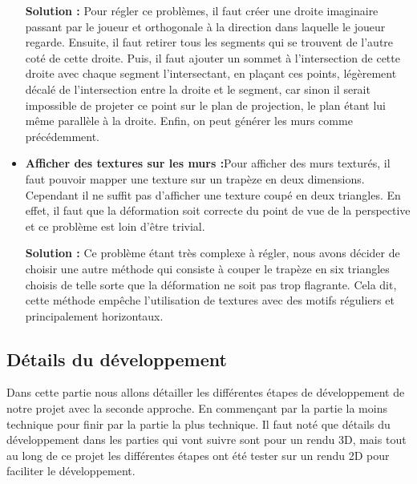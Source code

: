 \documentclass[12pt]{report}
\begin{document}
\begin{itemize}
	\textbf{Solution : }Pour régler ce problèmes, il faut créer une droite imaginaire passant par le 
	joueur et orthogonale à la direction dans laquelle le joueur regarde. Ensuite, il faut retirer
	tous les segments qui se trouvent de l'autre coté de cette droite. Puis, il faut ajouter un sommet
	à l'intersection de cette droite avec chaque segment l'intersectant, en plaçant ces points, 
	légèrement décalé de l'intersection entre la droite et le segment, car sinon il serait impossible de
	projeter ce point sur le plan de projection, le plan étant lui même parallèle à la droite. Enfin, 
	on peut générer les murs comme précédemment.

	\item \textbf{Afficher des textures sur les murs :}Pour afficher des murs texturés, il faut
	pouvoir mapper une texture sur un trapèze en deux dimensions. Cependant il ne suffit pas d'afficher 
	une texture coupé en deux triangles. En effet, il faut que la déformation soit correcte
	du point de vue de la perspective et ce problème est loin d'être trivial.

	\textbf{Solution : }Ce problème étant très complexe à régler, nous avons décider de choisir
	une autre méthode qui consiste à couper le trapèze en six triangles choisis de telle 
	sorte que la déformation ne soit pas trop flagrante. Cela dit, cette méthode empêche 
	l'utilisation de textures avec des motifs réguliers et principalement horizontaux.
\end{itemize}



\subsection{Détails du développement}
Dans cette partie nous allons détailler les différentes étapes de développement de notre 
projet avec la seconde approche. En commençant par la partie la moins technique pour 
finir par la partie la plus technique. Il faut noté que détails du développement dans les 
parties qui vont suivre sont pour un rendu 3D, mais tout au long de ce projet les 
différentes étapes ont été tester sur un rendu 2D pour faciliter le développement.
\end{document}
